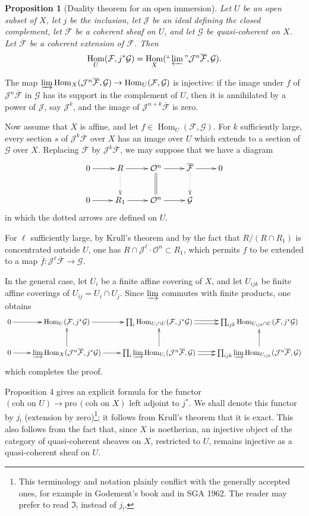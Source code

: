 \documentclass[12pt]{amsart}
\theoremstyle{plain}
\newtheorem{prop}{Proposition}
\theoremstyle{definition}
\DeclareMathOperator{\Hom}{Hom}
\newcommand{\Pro}{\text{pro}\,}
\newcommand{\cF}{\mathcal{F}}
\newcommand{\cG}{\mathcal{G}}
\newcommand{\cJ}{\mathcal{J}}
\newcommand{\cO}{\mathcal{O}}
\begin{document}
\begin{prop}[Duality theorem for an open immersion]
Let $U$ be an open subset of $X$, let $j$ be the inclusion, let $\cJ$ be an ideal defining the closed complement, let $\cF$ be a coherent sheaf on $U$, and let $\cG$ be quasi-coherent on $X$. Let $\overline{\cF}$ be a coherent extension of $\cF$. Then
\begin{equation}
\Hom_U(\cF,j^*\cG)=\Hom_X(\text{``}\varprojlim\text{''}\cJ^n\overline{\cF},\cG).
\end{equation}
\end{prop}

The map $\varinjlim\Hom_X(\cJ^n\overline{\cF},\cG)\to\Hom_U(\cF,\cG)$ is injective: if the image under $f$ of $\cJ^n\overline{\cF}$ in $\cG$ has its support in the complement of $U$, then it is annihilated by a power of $\cJ$, say $\cJ^k$, and the image of $\cJ^{n+k}\overline{\cF}$ is zero.

Now assume that $X$ is affine, and let $f\in\Hom_U(\cF,\cG)$. For $k$ sufficiently large, every section $s$ of $\cJ^k\overline{\cF}$ over $X$ has an image over $U$ which extends to a section of $\cG$ over $X$. Replacing $\overline{\cF}$ by $\cJ^k\overline{\cF}$, we may suppose that we have a diagram
\[
\xymatrix{
0 \ar[r] & R \ar[r] \ar@{.>}[d] & \cO^{n} \ar[r] \ar@{=}[d] & \overline{\cF} \ar[r] \ar@{.>}[d] & 0 \\
0 \ar[r] & R_1 \ar[r] & \cO^{n} \ar[r] & \cG &
}
\]
in which the dotted arrows are defined on $U$.

For $\ell$ sufficiently large, by Krull's theorem and by the fact that $R/(R\cap R_1)$ is concentrated outside $U$, one has $R\cap\cJ^\ell\cdot\cO^n\subset R_1$, which permits $f$ to be extended to a map $\overline f:\cJ^\ell\overline{\cF}\to\cG$.

In the general case, let $U_i$ be a finite affine covering of $X$, and let $U_{ijk}$ be finite affine coverings of $U_{ij}=U_i\cap U_j$. Since $\varinjlim$ commutes with finite products, one obtains
\[
\xymatrix{
0 \ar[r] & \Hom_U(\cF,j^*\cG) \ar[r] & \prod_i \Hom_{U_i\cap U}(\cF,j^*\cG) \ar@<.5ex>[r] \ar@<-.5ex>[r] & \prod_{ijk}\Hom_{U_{ijk}\cap U}(\cF,j^*\cG) \\
0 \ar[r] & \varinjlim\Hom_X(\cJ^n\overline{\cF},j^*\cG) \ar[r] \ar[u] & \prod_i\varinjlim\Hom_{U_i}(\cJ^n\overline{\cF},\cG) \ar@<.5ex>[r] \ar@<-.5ex>[r] \ar[u] & \prod_{ijk}\varinjlim\Hom_{U_{ijk}}(\cJ^n\overline{\cF},\cG) \ar[u]
}
\]
which completes the proof.

Proposition 4 gives an explicit formula for the functor $(\text{coh on }U)\to\Pro(\text{coh on }X)$ left adjoint to $j^*$. We shall denote this functor by $j_!$ (extension by zero)\footnote{This terminology and notation plainly conflict with the generally accepted ones, for example in Godement's book and in SGA 1962. The reader may prefer to read $\mathfrak I_!$ instead of $j_!$.}; it follows from Krull's theorem that it is exact. This also follows from the fact that, since $X$ is noetherian, an injective object of the category of quasi-coherent sheaves on $X$, restricted to $U$, remains injective as a quasi-coherent sheaf on $U$.
\end{document}
